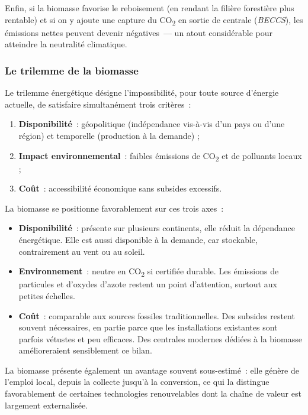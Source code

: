 Enfin, si la biomasse favorise le reboisement (en rendant la filière forestière plus rentable) et si on y ajoute une capture du CO\textsubscript{2} en sortie de centrale (\textit{BECCS}), les émissions nettes peuvent devenir négatives~--- un atout considérable pour atteindre la neutralité climatique.

\subsubsection{Le trilemme de la biomasse}

Le trilemme énergétique désigne l'impossibilité, pour toute source d'énergie actuelle, de satisfaire simultanément trois critères~:
\begin{enumerate}
    \item \textbf{Disponibilité}~: géopolitique (indépendance vis-à-vis d'un pays ou d'une région) et temporelle (production à la demande) ;
    \item \textbf{Impact environnemental}~: faibles émissions de CO\textsubscript{2} et de polluants locaux ;
    \item \textbf{Coût}~: accessibilité économique sans subsides excessifs.
\end{enumerate}

La biomasse se positionne favorablement sur ces trois axes~:
\begin{itemize}
    \item \textbf{Disponibilité}~: présente sur plusieurs continents, elle réduit la dépendance énergétique. Elle est aussi disponible à la demande, car stockable, contrairement au vent ou au soleil.
    \item \textbf{Environnement}~: neutre en CO\textsubscript{2} si certifiée durable. Les émissions de particules et d'oxydes d'azote restent un point d'attention, surtout aux petites échelles.
    \item \textbf{Coût}~: comparable aux sources fossiles traditionnelles. Des subsides restent souvent nécessaires, en partie parce que les installations existantes sont parfois vétustes et peu efficaces. Des centrales modernes dédiées à la biomasse amélioreraient sensiblement ce bilan.
\end{itemize}

La biomasse présente également un avantage souvent sous-estimé~: elle génère de l'emploi local, depuis la collecte jusqu'à la conversion, ce qui la distingue favorablement de certaines technologies renouvelables dont la chaîne de valeur est largement externalisée.

